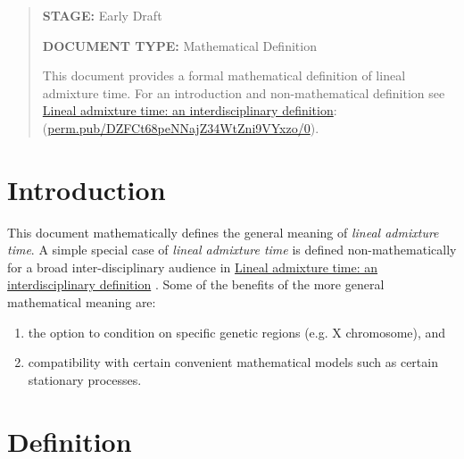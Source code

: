 





\newcommand{\dom}[1]{\operatorname{dom}{ #1}}
\newcommand{\mathstop}{\text{ .}}

\newcommand{\Gam}{\mathrm{Gam}}
\newcommand{\Loc}{\mathrm{Loc}}
\newcommand{\Lin}{\mathrm{Lin}}
\newcommand{\Mate}{\mathrm{Mate}}
\newcommand{\Par}{\mathrm{Par}}
\newcommand{\Fert}{\mathrm{Fert}}
\newcommand{\Mrlt}{\mathrm{Mrlt}}


\begin{abstract}
\textbf{STAGE:} Early Draft

\textbf{DOCUMENT TYPE:} Mathematical Definition

This document provides a formal mathematical definition of lineal
admixture time. For an introduction and non-mathematical definition see
\href{https://perm.pub/DZFCt68peNNajZ34WtZni9VYxzo/0}{Lineal admixture time: an interdisciplinary definition}:
\\ (\href{https://perm.pub/DZFCt68peNNajZ34WtZni9VYxzo/0}{perm.pub/DZFCt68peNNajZ34WtZni9VYxzo/0}).
\end{abstract}

\section{Introduction}

This document mathematically defines the general meaning of \emph{lineal admixture time}.
A simple special case of \emph{lineal admixture time} is defined non-mathematically
for a broad inter-disciplinary audience in
\href{https://perm.pub/DZFCt68peNNajZ34WtZni9VYxzo/0}{Lineal admixture time: an interdisciplinary definition}
\cite{dsi:DZ/0}.
Some of the benefits of the more general mathematical meaning are:
\begin{enumerate}
\item the option to condition on specific genetic regions (e.g. X chromosome), and
\item compatibility with certain convenient mathematical models such as certain stationary
processes.
\end{enumerate}


\section{Definition}

